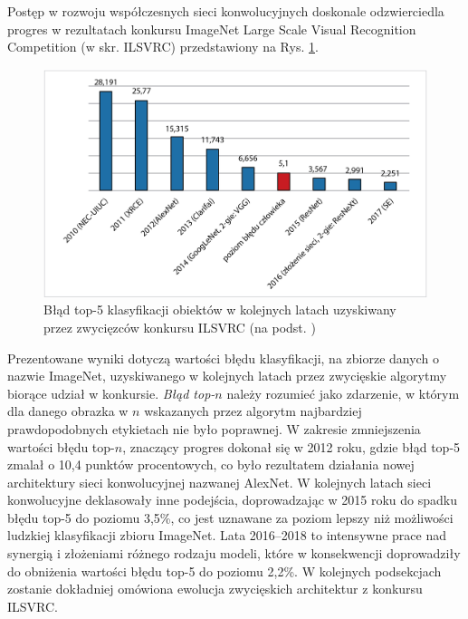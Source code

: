 Postęp w rozwoju współczesnych sieci konwolucyjnych doskonale odzwierciedla progres w rezultatach konkursu ImageNet Large Scale Visual Recognition Competition (w skr. ILSVRC) przedstawiony na Rys. \ref{ILSVRC}.
\begin{figure}[h!]
	\centering
	\includegraphics[width=1\textwidth]{figures/ILSVRC.jpg}
	\caption{Błąd top-5 klasyfikacji obiektów w kolejnych latach uzyskiwany przez zwycięzców konkursu ILSVRC (na podst. \cite{imagenet_cvpr09})}
	\label{ILSVRC}
\end{figure}
Prezentowane wyniki dotyczą wartości błędu klasyfikacji, na zbiorze danych \cite{imagenet_cvpr09} o nazwie ImageNet, uzyskiwanego w kolejnych latach przez zwycięskie algorytmy biorące udział w konkursie. \textit{Błąd top-$n$} należy rozumieć jako zdarzenie, w którym dla danego obrazka w $n$ wskazanych przez algorytm najbardziej prawdopodobnych etykietach nie było poprawnej. W zakresie zmniejszenia wartości błędu top-$n$, znaczący progres dokonał się w 2012 roku, gdzie błąd top-5 zmalał o 10,4 punktów procentowych, co było rezultatem działania nowej architektury sieci konwolucyjnej nazwanej AlexNet. W kolejnych latach sieci konwolucyjne deklasowały inne podejścia, doprowadzając w 2015 roku do spadku błędu top-5 do poziomu 3,5\%, co jest uznawane za poziom lepszy niż możliwości ludzkiej klasyfikacji zbioru ImageNet. Lata 2016--2018 to intensywne prace nad synergią i złożeniami różnego rodzaju modeli, które w konsekwencji doprowadziły \linebreak do obniżenia wartości błędu top-5 do poziomu 2,2\%. W kolejnych podsekcjach zostanie dokładniej omówiona ewolucja zwycięskich architektur z konkursu ILSVRC. 

